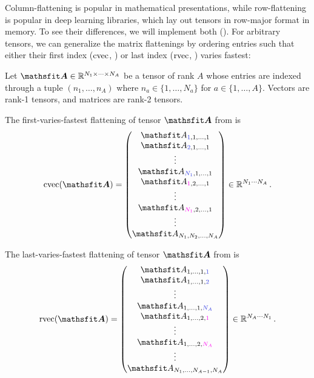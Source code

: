 Column-flattening is popular in mathematical presentations, while row-flattening is popular in deep learning libraries, which lay out tensors in row-major format in memory.
To see their differences, we will implement both ().
For arbitrary tensors, we can generalize the matrix flattenings by ordering entries such that either their first index ($\operatorname{cvec}$, ) or last index ($\operatorname{rvec}$, ) varies fastest:


\begin{setup}\label{setup:flattening}
  Let $\tA \in \sR^{N_1 \times \dots \times N_A}$ be a tensor of rank $A$ whose entries are indexed through a tuple $(n_1, \dots, n_A)$ where $n_a \in \{1, \dots, N_a\}$ for $a \in \{1, \dots, A\}$.
  Vectors are rank-1 tensors, and matrices are rank-2 tensors.
\end{setup}
\begin{definition}\label{def:cvec}
  The first-varies-fastest flattening of tensor $\tA$ from  is
  \begin{align*}
    \cvec(\tA) =
    \begin{pmatrix}
      \etA_{\colored{1},1,\dots,1}   \\
      \etA_{\colored{2},1,\dots,1}   \\
      \vdots               \\
      \etA_{\colored{N_1},1,\dots,1} \\
      \etA_{\colored[VectorPink]{1},2,\dots,1}   \\
      \vdots               \\
      \etA_{\colored[VectorPink]{N_1},2,\dots,1} \\
      \vdots               \\
      \etA_{N_1,N_2,\dots,N_A}
    \end{pmatrix}
    \in \sR ^{N_1 \cdots N_A}\,.
  \end{align*}
\end{definition}

\begin{definition}\label{def:rvec}
  The last-varies-fastest flattening of tensor $\tA$ from  is
  \begin{align*}
    \rvec(\tA) =
    \begin{pmatrix}
      \etA_{1,\dots,1,\colored{1}}   \\
      \etA_{1,\dots,1,\colored{2}}   \\
      \vdots               \\
      \etA_{1,\dots,1,\colored{N_A}} \\
      \etA_{1,\dots,2,\colored[VectorPink]{1}}   \\
      \vdots               \\
      \etA_{1,\dots,2,\colored[VectorPink]{N_A}} \\
      \vdots               \\
      \etA_{N_1,\dots,N_{A-1},N_A}
    \end{pmatrix}
    \in \sR ^{N_A \cdots N_1}\,.
  \end{align*}
\end{definition}

